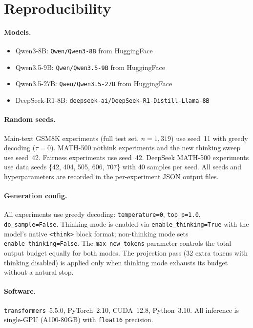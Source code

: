 \section{Reproducibility}
\label{app:reproducibility}

\paragraph{Models.}
\begin{itemize}[nosep,leftmargin=*]
    \item Qwen3-8B: \texttt{Qwen/Qwen3-8B} from HuggingFace
    \item Qwen3.5-9B: \texttt{Qwen/Qwen3.5-9B} from HuggingFace
    \item Qwen3.5-27B: \texttt{Qwen/Qwen3.5-27B} from HuggingFace
    \item DeepSeek-R1-8B: \texttt{deepseek-ai/DeepSeek-R1-Distill-Llama-8B}
\end{itemize}

\paragraph{Random seeds.}
Main-text GSM8K experiments (full test set, $n{=}1{,}319$) use seed~11
with greedy decoding ($\tau{=}0$).
MATH-500 nothink experiments and the new thinking sweep use seed~42.
Fairness experiments use seed~42.
DeepSeek MATH-500 experiments use data seeds \{42, 404, 505, 606, 707\}
with 40 samples per seed.
All seeds and hyperparameters are recorded in the per-experiment JSON
output files.

\paragraph{Generation config.}
All experiments use greedy decoding: \texttt{temperature=0}, \texttt{top\_p=1.0}, \texttt{do\_sample=False}.
Thinking mode is enabled via \texttt{enable\_thinking=True} with the model's native \texttt{<think>} block format; non-thinking mode sets \texttt{enable\_thinking=False}.
The \texttt{max\_new\_tokens} parameter controls the total output budget equally for both modes.
The projection pass (32 extra tokens with thinking disabled) is applied only when thinking mode exhausts its budget without a natural stop.

\paragraph{Software.}
\texttt{transformers}~5.5.0, PyTorch~2.10, CUDA~12.8, Python~3.10.
All inference is single-GPU (A100-80GB) with \texttt{float16} precision.

